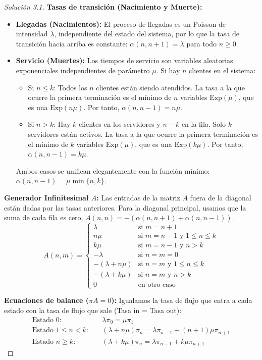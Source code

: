 \documentclass[10pt,a4paper]{article}
\begin{document}
\begin{proof}[Solución  3.1]
    \textbf{Tasas de transición (Nacimiento y Muerte):}
    \begin{itemize}
        \item \textbf{Llegadas (Nacimientos):} El proceso de llegadas es un Poisson de intensidad $\lambda$, independiente del estado del sistema, por lo que la tasa de transición hacia arriba es constante: $\alpha(n, n+1) = \lambda$ para todo $n \ge 0$.
        \item \textbf{Servicio (Muertes):} Los tiempos de servicio son variables aleatorias exponenciales independientes de parámetro $\mu$. Si hay $n$ clientes en el sistema:
        \begin{itemize}
            \item Si $n \le k$: Todos los $n$ clientes están siendo atendidos. La tasa a la que ocurre la primera terminación es el mínimo de $n$ variables $\text{Exp}(\mu)$, que es una $\text{Exp}(n\mu)$. Por tanto, $\alpha(n, n-1) = n\mu$.
            \item Si $n > k$: Hay $k$ clientes en los servidores y $n-k$ en la fila. Solo $k$ servidores están activos. La tasa a la que ocurre la primera terminación es el mínimo de $k$ variables $\text{Exp}(\mu)$, que es una $\text{Exp}(k\mu)$. Por tanto, $\alpha(n, n-1) = k\mu$.
        \end{itemize}
        Ambos casos se unifican elegantemente con la función mínimo: $\alpha(n, n-1) = \mu \min\{n,k\}$.
    \end{itemize}

    \textbf{Generador Infinitesimal $A$:}
    Las entradas de la matriz $A$ fuera de la diagonal están dadas por las tasas anteriores. Para la diagonal principal, usamos que la suma de cada fila es cero, $A(n,n) = -(\alpha(n, n+1) + \alpha(n, n-1))$.
    \[ A(n,m) = \begin{cases} 
        \lambda & \text{si } m = n+1 \\
        n\mu & \text{si } m = n-1 \text{ y } 1 \le n \le k \\
        k\mu & \text{si } m = n-1 \text{ y } n > k \\
        -\lambda & \text{si } n = m = 0 \\
        -(\lambda + n\mu) & \text{si } n = m \text{ y } 1 \le n \le k \\
        -(\lambda + k\mu) & \text{si } n = m \text{ y } n > k \\
        0 & \text{en otro caso}
    \end{cases} \]

    \textbf{Ecuaciones de balance  ($\pi A = 0$):}
    Igualamos la tasa de flujo que entra a cada estado con la tasa de flujo que sale (Tasa in = Tasa out):
    \begin{align*}
        \text{Estado } 0: \quad &\lambda \pi_0 = \mu \pi_1 \\
        \text{Estado } 1 \le n < k: \quad &(\lambda + n\mu) \pi_n = \lambda \pi_{n-1} + (n+1)\mu \pi_{n+1} \\
        \text{Estado } n \ge k: \quad &(\lambda + k\mu) \pi_n = \lambda \pi_{n-1} + k\mu \pi_{n+1}
    \end{align*}
\end{proof}
\end{document}
